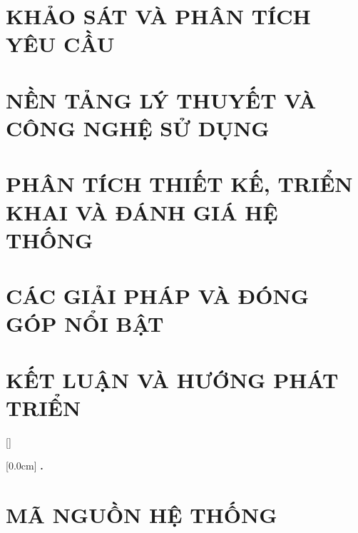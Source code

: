 \documentclass[a4paper,13pt,3p,twoside]{report}
\renewcommand{\bibname}{Danh\_sach\_tai\_lieu\_tham\_khao}
\theoremstyle{definition}
\begin{document}
\newpage
\chapter{KHẢO SÁT VÀ PHÂN TÍCH YÊU CẦU}
\label{chapter:survey}


\newpage
\chapter{NỀN TẢNG LÝ THUYẾT VÀ CÔNG NGHỆ SỬ DỤNG}
\label{chapter:litreview}


\newpage
\chapter{PHÂN TÍCH THIẾT KẾ, TRIỂN KHAI VÀ ĐÁNH GIÁ HỆ THỐNG}
\label{chapter:design}



\newpage
\chapter{CÁC GIẢI PHÁP VÀ ĐÓNG GÓP NỔI BẬT}
\label{chapter:contribution}


\newpage
\chapter{KẾT LUẬN VÀ HƯỚNG PHÁT TRIỂN}
\label{chapter:conclusion}


\newpage
\renewcommand\bibname{TÀI LIỆU THAM KHẢO}
\printbibliography
{}

\appendixpage
\appendices
\addappheadtotoc

[]
\titlespacing*{\chapter}{0pt}{-20pt}{20pt}

    [0.0cm]
    {\bfseries\vspace{0.3cm}}
    {{\bfseries{\scshape}\thecontentslabel.\ }}
    {}
    {\contentspage}

\chapter{MÃ NGUỒN HỆ THỐNG}
\label{appendix:source}
\end{document}
